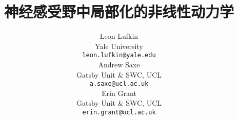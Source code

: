 \documentclass{article}
\title{
  神经感受野中局部化的非线性动力学
}
\author{
	Leon Lufkin \\
	Yale University \\
	\texttt{leon.lufkin@yale.edu} \\
    	\And
	Andrew Saxe \\
	Gatsby Unit \& SWC, UCL \\
	\texttt{a.saxe@ucl.ac.uk} \\
	\And
	Erin Grant \\
	Gatsby Unit \& SWC, UCL \\
	\texttt{erin.grant@ucl.ac.uk}
}
\begin{document}
\begin{CJK*}{UTF8}{gbsn}

\maketitle

\begin{abstract}
  
\end{abstract}








\clearpage


\printbibliography

\clearpage
\appendix



\end{CJK*}
\end{document}

